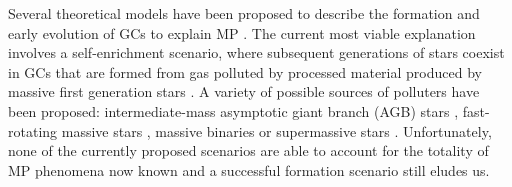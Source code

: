\documentclass[onecolumn]{aa}
\begin{document}
Several theoretical models have been proposed to describe the formation and early evolution of GCs  to explain MP \citep[e.g.,][]{DAntona2016}.
The current most viable explanation involves a self-enrichment scenario, where subsequent generations of stars coexist in GCs that are formed from gas polluted by processed material produced by massive first generation stars \citep{Renzini2015}. A variety of possible
sources of polluters have been proposed: intermediate-mass asymptotic giant branch (AGB) stars \citep{DAntona2016}, fast-rotating massive stars \citep{Decressin2007},  massive binaries \citep{deMink2009} or supermassive stars \citep{Gieles2018}.  
Unfortunately, none of the currently proposed scenarios are able to account for the totality of MP phenomena now known \citep{Renzini2015, Bastian2018} and a successful formation scenario still eludes us. 

\end{document}
